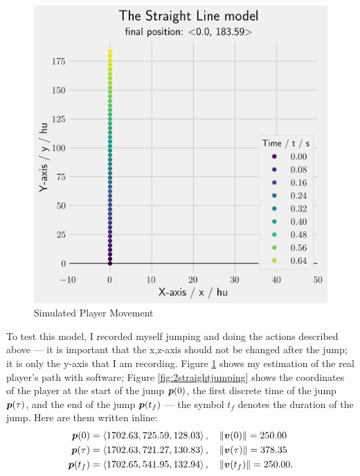 \begin{figure}[H]
\begin{minipage}{.5\textwidth}
        \includegraphics[width=0.9\linewidth]{assets/straight_constraint.png}
        \caption{Simulated Player Movement}
        \label{fig:straight_constraint}
    \end{minipage}
\end{figure}

To test this model, I recorded myself jumping and doing the actions described above --- it is important that the x,z-axis should not be changed after the jump; it is only the y-axis that I am recording. Figure \ref{fig:straight_constraint} shows my estimation of the real player's path with software; Figure \ref{fig:2straightjumping} shows the coordinates of the player at the start of the jump $\boldsymbol{p}(0)$, the first discrete time of the jump $\boldsymbol{p}(\tau)$, and the end of the jump $\boldsymbol{p}(t_f)$ --- the symbol $t_f$ denotes the duration of the jump. Here are them written inline:
\begin{align}
 \boldsymbol{p}(0) &= \left\langle 1702.63, 725.59, 128.03 \right\rangle, \quad \|\boldsymbol{v}(0)\| = 250.00 \label{eq:2emp0}\\
 \boldsymbol{p}(\tau) &= \left\langle 1702.63, 721.27, 130.83 \right\rangle, \quad \|\boldsymbol{v}(\tau)\| = 378.35 \label{eq:2emp1}\\
 \boldsymbol{p}(t_f) &= \left\langle 1702.65,541.95, 132.94 \right\rangle, \quad \|\boldsymbol{v}(t_f)\| = 250.00 \label{eq:2emp2}.
\end{align}

